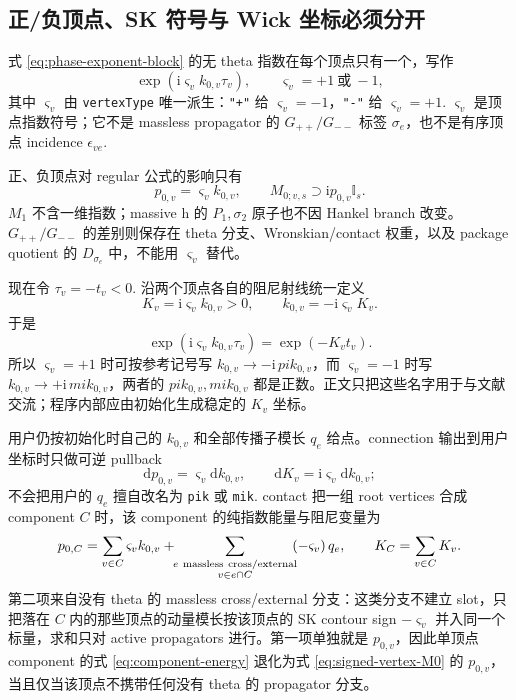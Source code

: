 \documentclass[11pt,a4paper]{ctexart}
\newcommand{\dd}{\mathrm d}
\newcommand{\ii}{\mathrm i}
\newcommand{\Id}{\mathbb I}
\begin{document}
\subsection{正/负顶点、SK 符号与 Wick 坐标必须分开}

式 \eqref{eq:phase-exponent-block} 的无 theta 指数在每个顶点只有一个，写作
\begin{equation}
 \exp(\ii\varsigma_vk_{0,v}\tau_v),
 \qquad \varsigma_v=+1\ \text{或}\ -1,
 \label{eq:vertex-phase-sign}
\end{equation}
其中 $\varsigma_v$ 由 \texttt{vertexType} 唯一派生：\texttt{"+"} 给 $\varsigma_v=-1$，\texttt{"-"} 给 $\varsigma_v=+1$. $\varsigma_v$ 是顶点指数符号；它不是 massless propagator 的 $G_{++}/G_{--}$ 标签 $\sigma_e$，也不是有序顶点 incidence $\epsilon_{ve}$.

正、负顶点对 regular 公式的影响只有
\begin{equation}
 p_{0,v}=\varsigma_vk_{0,v},
 \qquad
 M_{0;v,s}\supset\ii p_{0,v}\Id_s.
 \label{eq:signed-vertex-M0}
\end{equation}
$M_1$ 不含一维指数；massive h 的 $P_1,\sigma_2$ 原子也不因 Hankel branch 改变。$G_{++}/G_{--}$ 的差别则保存在 theta 分支、Wronskian/contact 权重，以及 package quotient 的 $D_{\sigma_e}$ 中，不能用 $\varsigma_v$ 替代。

现在令 $\tau_v=-t_v<0$. 沿两个顶点各自的阻尼射线统一定义
\begin{equation}
 K_v=\ii\varsigma_vk_{0,v}>0,
 \qquad
 k_{0,v}=-\ii\varsigma_vK_v.
 \label{eq:unified-vertex-wick-coordinate}
\end{equation}
于是
\begin{equation}
 \exp(\ii\varsigma_vk_{0,v}\tau_v)=\exp(-K_vt_v).
\end{equation}
所以 $\varsigma_v=+1$ 时可按参考记号写 $k_{0,v}\to-\ii\,pik_{0,v}$，而 $\varsigma_v=-1$ 时写 $k_{0,v}\to+\ii\,mik_{0,v}$，两者的 $pik_{0,v},mik_{0,v}$ 都是正数。正文只把这些名字用于与文献交流；程序内部应由初始化生成稳定的 $K_v$ 坐标。

用户仍按初始化时自己的 $k_{0,v}$ 和全部传播子模长 $q_e$ 给点。connection 输出到用户坐标时只做可逆 pullback
\begin{equation}
 \dd p_{0,v}=\varsigma_v\dd k_{0,v},
 \qquad
 \dd K_v=\ii\varsigma_v\dd k_{0,v};
 \label{eq:user-to-internal-coordinate-pullback}
\end{equation}
不会把用户的 $q_e$ 擅自改名为 \texttt{pik} 或 \texttt{mik}. contact 把一组 root vertices 合成 component $C$ 时，该 component 的纯指数能量与阻尼变量为
\begin{equation}
 p_{0,C}
 =\sum_{v\in C}\varsigma_vk_{0,v}
 +\!\!\sum_{\substack{e\ {\rm massless\ cross/external}\\ v\in e\cap C}}\!\!(-\varsigma_v)\,q_e,
 \qquad
 K_C=\sum_{v\in C}K_v.
 \label{eq:component-energy}
\end{equation}
第二项来自没有 theta 的 massless cross/external 分支：这类分支不建立 slot，只把落在 $C$ 内的那些顶点的动量模长按该顶点的 SK contour sign $-\varsigma_v$ 并入同一个标量，求和只对 active propagators 进行。第一项单独就是 $p_{0,v}$，因此单顶点 component 的式 \eqref{eq:component-energy} 退化为式 \eqref{eq:signed-vertex-M0} 的 $p_{0,v}$，当且仅当该顶点不携带任何没有 theta 的 propagator 分支。
\end{document}
